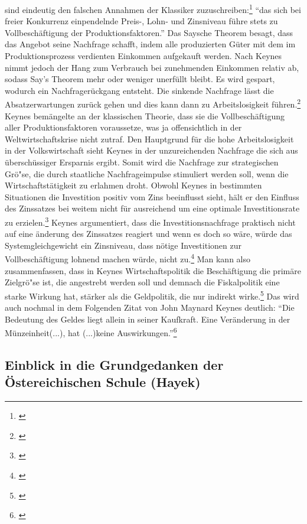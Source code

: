 \documentclass[
        onecolumn,
        a4paper,
        abstracton,
        parskip=half
        ,final
        ]{scrartcl}
\begin{document}
sind eindeutig den falschen Annahmen der Klassiker zuzuschreiben:\footnote[603]{\citep*[S.36]{Keynes2011}} "`das sich bei freier Konkurrenz einpendelnde Preis-, Lohn- und Zinsniveau f{\"u}hre stets zu Vollbesch{\"a}ftigung der Produktionsfaktoren."'
Das Saysche Theorem besagt, dass das Angebot seine Nachfrage schafft, indem alle produzierten G{\"u}ter mit dem im Produktionsprozess verdienten
Einkommen aufgekauft werden. Nach Keynes nimmt jedoch der Hang zum Verbrauch bei zunehmenden Einkommen relativ ab, sodass Say's Theorem mehr oder weniger unerf{\"u}llt bleibt. Es wird gespart, wodurch ein Nachfrager{\"u}ckgang entsteht. Die sinkende
Nachfrage l{\"a}sst die Absatzerwartungen zur{\"u}ck gehen und dies kann dann zu Arbeitslosigkeit f{\"u}hren.\footnote[604]{\citep*[S.203]{peters2000}} Keynes bem{\"a}ngelte an der klassischen Theorie, dass sie die Vollbesch{\"a}ftigung aller Produktionsfaktoren voraussetze, was ja offensichtlich in
der Weltwirtschaftskrise nicht zutraf. Den Hauptgrund f{\"u}r die hohe Arbeitslosigkeit in der Volkswirtschaft sieht Keynes in der unzureichenden Nachfrage die sich aus {\"u}bersch{\"u}ssiger Ersparnis ergibt. Somit wird die Nachfrage zur strategischen Gr{\"o}{"s}e,
die durch staatliche Nachfrageimpulse stimuliert werden soll, wenn die
Wirtschaftst{\"a}tigkeit zu erlahmen droht. Obwohl Keynes in bestimmten Situationen die
Investition positiv vom Zins beeinflusst sieht, h{\"a}lt er den Einfluss des Zinssatzes
bei weitem nicht f{\"u}r ausreichend um eine optimale Investitionsrate zu erzielen.\footnote[605]{\citep*[S.208]{peters2000}}
Keynes argumentiert, dass die Investitionsnachfrage praktisch nicht auf eine
{\"a}nderung des Zinssatzes reagiert und wenn es doch so w{\"a}re, w{\"u}rde das Systemgleichgewicht
ein Zinsniveau, dass n{\"o}tige Investitionen zur Vollbesch{\"a}ftigung lohnend machen w{\"u}rde,
nicht zu.\footnote[606]{ \citep*[S.174]{bombach1981theorie}}
Man kann also zusammenfassen, dass in Keynes Wirtschaftspolitik die Besch{\"a}ftigung
die prim{\"a}re Zielgr{\"o}{"s}e ist, die angestrebt werden soll und demnach die Fiskalpolitik
eine starke Wirkung hat, st{\"a}rker als die Geldpolitik, die nur indirekt wirke.\footnote[607]{ \citep*[S.181]{bombach1981theorie}}
Das wird auch nochmal in dem Folgenden Zitat von John Maynard Keynes deutlich:
"`Die Bedeutung des Geldes liegt allein in seiner Kaufkraft. Eine Ver{\"a}nderung in der
M{\"u}nzeinheit(...), hat (...)keine Auswirkungen."'\footnote[608]{\citep*[S.1]{Keynes1997}}




\subsection{Einblick in die Grundgedanken der {\"O}stereichischen Schule (Hayek)} %
\end{document}
